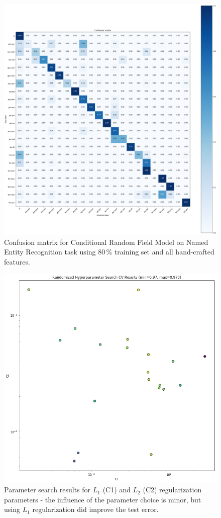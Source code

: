 \documentclass[twocolumns]{IEEEtran}
\begin{document}
\pagebreak
\begin{figure}
\centering
\includegraphics[scale=0.4]{NER_CRF.png}
\caption{Confusion matrix for Conditional Random Field Model on Named Entity Recognition task using 80\,\% training set and all hand-crafted features.}
\end{figure}

\pagebreak
\begin{figure}
\centering
\includegraphics[scale=0.6]{crf_hyperparam_search.png}
\caption{Parameter search results for $L_1$ (C1) and $L_2$ (C2) regularization parameters - the influence of the parameter choice is minor, but using $L_1$ regularization did improve the test error.}
\end{figure}
\end{document}
